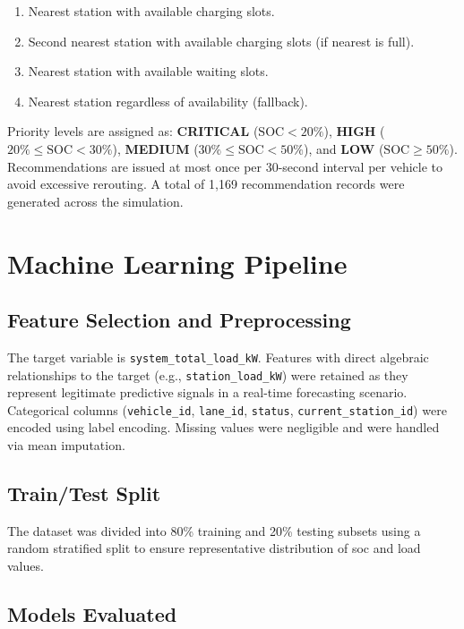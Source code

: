 \documentclass{thesis-library}
\begin{document}
\begin{enumerate}
  \item Nearest station with available charging slots.
  \item Second nearest station with available charging slots (if nearest is full).
  \item Nearest station with available waiting slots.
  \item Nearest station regardless of availability (fallback).
\end{enumerate}

Priority levels are assigned as: \textbf{CRITICAL} ($\text{SOC} < 20\%$), \textbf{HIGH}
($20\% \leq \text{SOC} < 30\%$), \textbf{MEDIUM} ($30\% \leq \text{SOC} < 50\%$), and
\textbf{LOW} ($\text{SOC} \geq 50\%$). Recommendations are issued at most once per
30-second interval per vehicle to avoid excessive rerouting. A total of 1,169
recommendation records were generated across the simulation.

\section{Machine Learning Pipeline}

\subsection{Feature Selection and Preprocessing}

The target variable is \texttt{system\_total\_load\_kW}. Features with direct algebraic
relationships to the target (e.g., \texttt{station\_load\_kW}) were retained as they
represent legitimate predictive signals in a real-time forecasting scenario. Categorical
columns (\texttt{vehicle\_id}, \texttt{lane\_id}, \texttt{status},
\texttt{current\_station\_id}) were encoded using label encoding. Missing values were
negligible and were handled via mean imputation.

\subsection{Train/Test Split}

The dataset was divided into 80\% training and 20\% testing subsets using a random
stratified split to ensure representative distribution of \Gls{soc} and load values.

\subsection{Models Evaluated}
\end{document}
